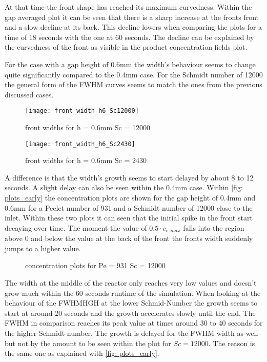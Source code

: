 \documentclass[../thesis.tex]{subfiles}
\begin{document}
At that time the front shape has reached its maximum curvedness. Within the gap averaged plot it can be seen that there is a sharp increase at the fronts front and a slow decline at its back. This decline lowers when comparing the plots for a time of 18 seconds with the one at 60 seconds. The decline can be explained by the curvedness of the front as visible in the product concentration fields plot.
\newline

For the case with a gap height of 0.6mm the width's behaviour seems to change quite significantly compared to the 0.4mm case. For the Schmidt number of 12000 the general form of the FWHM curves seems to match the ones from the previous discussed cases.
\begin{figure}[htbp]
	\centering
	\texttt{[image: front\_width\_h6\_Sc12000]}
	\caption{front widths for  h = 0.6mm Sc = 12000\label{fig: front_width_h6_Sc12000}}\bigskip
	\texttt{[image: front\_width\_h6\_Sc2430]}
	\caption{front widths for  h = 0.6mm Sc = 2430\label{fig: front_width_pos_h6_Sc2430}}
\end{figure}
A difference is that the width's growth seems to start delayed by about 8 to 12 seconds. A slight delay can also be seen within the 0.4mm case. Within \autoref{fig: plots_early} the concentration plots are shown for the gap height of 0.4mm and 0.6mm for a Peclet number of 931 and a Schmidt number of 12000 close to the inlet. Within these two plots it can seen that the initial spike in the front start decaying over time. The moment the value of $0.5 \cdot c_{c,max}$ falls into the region above 0 and below the value at the back of the front the fronts width suddenly jumps to a higher value.
\begin{figure}[htb]
	\centering
	\qquad
	\caption{concentration plots for  Pe = 931 Sc = 12000}%
	\label{fig: plots_early}%
\end{figure}
The width at the middle of the reactor only reaches very low values and doesn't grow much within the 60 seconds runtime of the simulation. When looking at the behaviour of the FWHMHGH at the lower Schmid-Number the growth seems to start at around 20 seconds and the growth accelerates slowly until the end. The FWHM in comparison reaches its peak value at times around 30 to 40 seconds for the higher Schmidt number. The growth is delayed for the FWHM width as well but not by the amount to be seen within the plot for $Sc = 12000$. The reason is the same one as explained with \autoref{fig: plots_early}.
\end{document}
